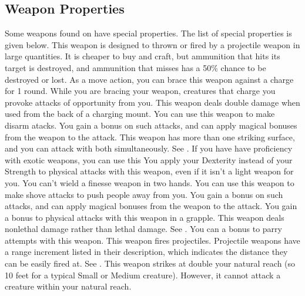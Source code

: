\subsection{Weapon Properties}
Some weapons found on  have special properties. The list of special properties is given below.
 This weapon is designed to thrown or fired by a projectile weapon in large quantities. It is cheaper to buy and craft, but ammunition that hits its target is destroyed, and ammunition that misses has a 50\% chance to be destroyed or lost.
 As a move action, you can brace this weapon against a charge for 1 round. While you are bracing your weapon, creatures that charge you provoke attacks of opportunity from you.
 This weapon deals double damage when used from the back of a charging mount.
 You can use this weapon to make disarm atacks. You gain a  bonus on such attacks, and can apply magical bonuses from the weapon to the attack.
 This weapon has more than one striking surface, and you can attack with both simultaneously. See .
 If you have have proficiency with exotic weapons, you can use this 
 You apply your Dexterity instead of your Strength to physical attacks with this weapon, even if it isn't a light weapon for you. You can't wield a finesse weapon in two hands.
 You can use this weapon to make shove attacks to push people away from you. You gain a  bonus on such attacks, and can apply magical bonuses from the weapon to the attack.
 You gain a  bonus to physical attacks with this weapon in a grapple.
 This weapon deals nonlethal damage rather than lethal damage. See .
 You can a  bonus to parry attempts with this weapon.
 This weapon fires projectiles. Projectile weapons have a range increment listed in their description, which indicates the distance they can be easily fired at. See .
 This weapon strikes at double your natural reach (so 10 feet for a typical Small or Medium creature). However, it cannot attack a creature within your natural reach.

